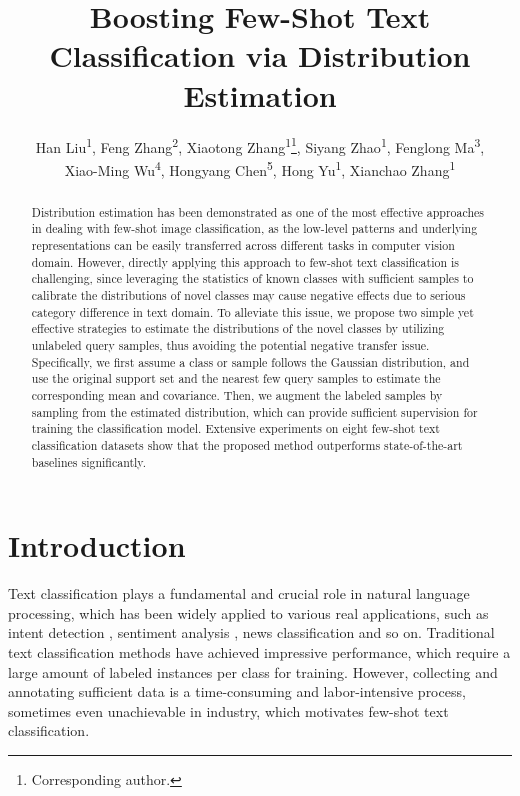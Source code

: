 \documentclass[letterpaper]{article} %
\title{Boosting Few-Shot Text Classification via Distribution Estimation}
\author {
    Han Liu\textsuperscript{\rm 1},
    Feng Zhang\textsuperscript{\rm 2},
    Xiaotong Zhang\textsuperscript{\rm 1}\thanks{Corresponding author.},
    Siyang Zhao\textsuperscript{\rm 1},
    Fenglong Ma\textsuperscript{\rm 3},\\
    Xiao-Ming Wu\textsuperscript{\rm 4},
    Hongyang Chen\textsuperscript{\rm 5},
    Hong Yu\textsuperscript{\rm 1},
    Xianchao Zhang\textsuperscript{\rm 1}
}
\begin{document}
\maketitle

\begin{abstract}
Distribution estimation has been demonstrated as one of the most effective approaches in dealing with few-shot image classification, as the low-level patterns and underlying representations can be easily transferred across different tasks in computer vision domain. However, directly applying this approach to few-shot text classification is challenging, since leveraging the statistics of known classes with sufficient samples to calibrate the distributions of novel classes may cause negative effects due to serious category difference in text domain. To alleviate this issue, we propose two simple yet effective strategies to estimate the distributions of the novel classes by utilizing unlabeled query samples, thus avoiding the potential negative transfer issue. Specifically, we first assume a class or sample follows the Gaussian distribution, and use the original support set and the nearest few query samples to estimate the corresponding mean and covariance. Then, we augment the labeled samples by sampling from the estimated distribution, which can provide sufficient supervision for training the classification model. Extensive experiments on eight few-shot text classification datasets show that the proposed method outperforms state-of-the-art baselines significantly.
\end{abstract}

\section{Introduction}
Text classification plays a fundamental and crucial role in natural language processing, which has been widely applied to various real applications, such as intent detection \cite{DBLP:conf/coling/LouvanM20}, sentiment analysis \cite{DBLP:journals/nca/KumarA21}, news classification \cite{DBLP:conf/icwsm/BozarthB20} and so on.
Traditional text classification methods \cite{DBLP:conf/acl/JohnsonZ17, DBLP:conf/naacl/DevlinCLT19} have achieved impressive performance, which require a large amount of
labeled instances per class for training. However, collecting and annotating sufficient data is a time-consuming and labor-intensive process, sometimes even unachievable in industry, which motivates few-shot text classification. 
\end{document}
